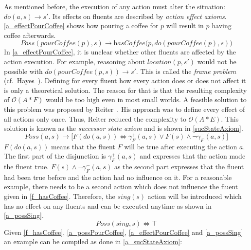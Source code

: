 As mentioned before, the execution of any action must alter the situation: $\textit{do}(a,s) \rightarrow s'$.
Its effects on fluents are described by \emph{action effect axioms}.
\autoref{a_effectPourCoffee} shows how pouring a coffee for $p$ will result in $p$ having coffee afterwards.
\begin{equation}\label{a_effectPourCoffee}
  \textit{Poss}(\textit{pourCoffee}(p),s) \rightarrow \textit{hasCoffee}\big(p,\textit{do}(\textit{pourCoffee}(p),s)\big)
\end{equation}
In \autoref{a_effectPourCoffee}, it is unclear whether other fluents are affected by the action execution.
For example, reasoning about $location(p,s')$ would not be possible with $\textit{do}(\textit{pourCoffee}(p,s)) \rightarrow s'$.
This is called the \emph{frame problem} (cf.\ Hayes~\cite{hayes_frame_1971}). %
Defining for every fluent how every action does or does not affect it is only a theoretical solution.
The reason for that is that the resulting complexity of $\mathcal{O}(A*F)$ would be too high even in most small worlds.
A feasible solution to this problem was proposed by Reiter~\cite{reiter_frame_1991}.
His approach was to define every effect of all actions only once.
Thus, Reiter reduced the complexity to $\mathcal{O}(A*E)$.
This solution is known as the \emph{successor state axiom} and is shown in \autoref{sucStateAxiom}.
\begin{equation}\label{sucStateAxiom}
  \mathit{Poss}(a,s)\rightarrow \big[\mathit{F}(\mathit{do}(a,s)) \Leftrightarrow\gamma_\mathit{F}^+(a,s)\vee\mathit{F}(s)\wedge\neg\gamma_\mathit{F}^-(a,s)\big]
\end{equation}
$\mathit{F}(\mathit{do}(a,s))$ means that the fluent $F$ will be true after executing the action $a$.
The first part of the disjunction is $\gamma_\mathit{F}^+(a,s)$ and expresses that the action made the fluent true.
$\mathit{F}(s)\wedge\neg\gamma_\mathit{F}^-(a,s)$ as the second part expresses that the fluent had been true before and the action had no influence on it.
For a reasonable example, there needs to be a second action which does not influence the fluent given in \autoref{f_hasCoffee}.
Therefore, the $sing(s)$ action will be introduced which has no effect on any fluents and can be executed anytime as shown in \autoref{a_possSing}.
\begin{equation}\label{a_possSing}
  \mathit{Poss}(\mathit{sing}, s) \Leftrightarrow \top
\end{equation}
Given \autoref{f_hasCoffee}, \ref{a_possPourCoffee}, \ref{a_effectPourCoffee} and \ref{a_possSing} an example can be compiled as done in \autoref{a_sucStateAxiom}:
